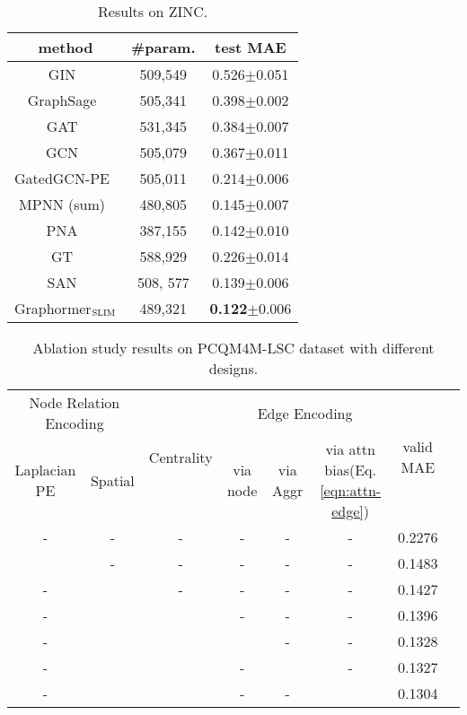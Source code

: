 \documentclass{article}
\newcommand{\yes}{\ding{51}}
\begin{document}
\begin{table}[ht]
\small
\centering
\caption{Results on ZINC. }
\label{tab:zinc}
\begin{tabular}{c|c|c}
\toprule
method                & \#param.  & test MAE \\ \hline
GIN~\cite{xu2018how}  & 509,549   & 0.526$\pm$0.051 \\
GraphSage~\cite{hamilton2017inductive}  & 505,341   & 0.398$\pm$0.002 \\
GAT~\cite{velivckovic2018graph}  & 531,345 & 0.384$\pm$0.007 \\
GCN~\cite{kipf2016semi}  & 505,079   & 0.367$\pm$0.011	 \\
GatedGCN-PE~\cite{bresson2017residual} & 505,011   & 0.214$\pm$0.006 \\
MPNN (sum)~\cite{gilmer2017neural}  & 480,805   & 0.145$\pm$0.007 \\
PNA~\cite{corso2020principal}         & 387,155   & 0.142$\pm$0.010 \\
\hline
GT~\cite{dwivedi2021generalization} & 588,929 & 0.226$\pm$0.014 \\
SAN~\cite{Kreuzer2021rethinking} & 508, 577 & 0.139$\pm$0.006 \\
\hline
Graphormer$_{\small \textsc{SLIM}}$ & 489,321 & \textbf{0.122}$\pm$0.006  \\ 
\bottomrule
\end{tabular}
\end{table}

\begin{table}[ht]
\small
\centering
\caption{
Ablation study results on PCQM4M-LSC dataset with different designs. }
\label{tab:ablation-table}
\begin{tabular}{cccccccc}
\toprule
\multicolumn{2}{c}{Node Relation Encoding} & \multirow{2}{*}{Centrality} & \multicolumn{3}{c}{Edge Encoding}  & \multirow{2}{*}{valid MAE} \\ \cline{1-2} \cline{4-6}
 Laplacian PE\cite{dwivedi2021generalization}&Spatial&&via node&via Aggr&via attn bias(Eq.\ref{eqn:attn-edge})&&\\ \hline
  -&-&-&-&-&-&0.2276\\ \hline
  \yes&-&-&-&-&-&0.1483\\ \hline
  -&\yes&-&-&-&-&0.1427\\ \hline
  -&\yes&\yes&-&-&-&0.1396\\ \hline
  -&\yes&\yes&\yes&-&-&0.1328\\ \hline
  -&\yes&\yes&-&\yes&-&0.1327\\ \hline
  -&\yes&\yes&-&-&\yes&0.1304\\
\bottomrule
\end{tabular}
\end{table}
\end{document}
